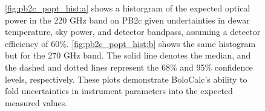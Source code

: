 \begin{figure}[!ht]
    \caption[Expected optical power for PB2c in both the 220 and 270 GHz bands as simulated by BoloCalc]{\ref{fig:pb2c_popt_hist:a} shows a historgram of the expected optical power in the 220 GHz band on PB2c given undertainties in dewar temperature, sky power, and detector bandpass, assuming a detector efficiency of 60\%. \ref{fig:pb2c_popt_hist:b} shows the same histogram but for the 270 GHz band. The solid line denotes the median, and the dashed and dotted lines represent the 68\% and 95\% confidence levels, respectively. These plots demonstrate BoloCalc's ability to fold uncertainties in instrument parameters into the expected measured values.}
    \label{fig:pb2c_popt_hist}
\end{figure}


